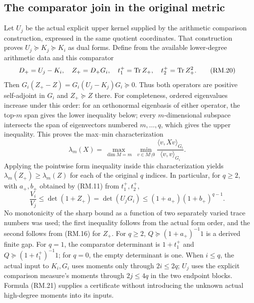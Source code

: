 \subsection{The comparator join in the original metric}
Let $U_j$ be the actual explicit upper kernel supplied by the arithmetic
comparison construction, expressed in the same quotient coordinates.
That construction proves $U_j\succeq K_j\succeq K_i$ as dual forms.
Define from the available lower-degree arithmetic data and this comparator
\begin{equation}
 D_+=U_j-K_i,\quad Z_+=D_+G_i,\quad
 t_1^+=\operatorname{Tr} Z_+,\quad t_2^+=\operatorname{Tr} Z_+^2.\tag{RM.20}
\end{equation}
Then $G_i(Z_+-Z)=G_i(U_j-K_j)G_i\succeq0$. Thus both operators are
positive self-adjoint in $G_i$ and $Z_+\succeq Z$ there. For completeness,
ordered eigenvalues increase under this order: for an orthonormal eigenbasis
of either operator, the top-$m$ span gives the lower inequality below;
every $m$-dimensional subspace intersects the span of eigenvectors numbered
$m,\ldots,q$, which gives the upper inequality. This proves the max--min characterization
\[
 \lambda_m(X)=\max_{\dim M=m}\ \min_{v\in M\setminus0}
 \frac{\langle v,Xv\rangle_{G_i}}{\langle v,v\rangle_{G_i}}.
\]
Applying the pointwise form inequality inside this characterization yields
$\lambda_m(Z_+)\ge\lambda_m(Z)$ for each of the original $q$ indices.
In particular, for $q\ge2$, with $a_+,b_+$ obtained by (RM.11) from $t_1^+,t_2^+$,
\begin{equation}
 \frac{V_i}{V_j}\le\det(1+Z_+)=\det(U_jG_i)
 \le(1+a_+)(1+b_+)^{q-1}.\tag{RM.21}
\end{equation}
No monotonicity of the sharp bound as a function of two separately varied
trace numbers was used; the first inequality follows from the actual form
order, and the second follows from (RM.16) for $Z_+$.
For $q\ge2$, $Q\succeq(1+a_+)^{-1}1$ is a derived finite gap.
For $q=1$, the comparator determinant is $1+t_1^+$ and
$Q\succeq(1+t_1^+)^{-1}1$; for $q=0$, the empty determinant is one.
When $i\le q$, the actual input to $K_i,G_i$ uses moments only through
$2i\le2q$; $U_j$ uses the explicit comparison measure's moments through
$2j\le4q$ in the two endpoint blocks. Formula (RM.21) supplies a certificate
without introducing the unknown actual high-degree moments into its inputs.

